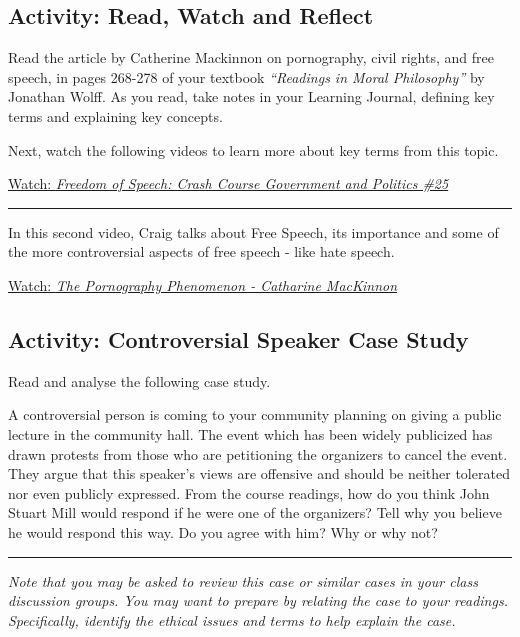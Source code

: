 \documentclass[
]{book}
\begin{document}
\hypertarget{activity-read-watch-and-reflect-7}{%
\subsection*{Activity: Read, Watch and Reflect}\label{activity-read-watch-and-reflect-7}}

\begin{reflect}
Read the article by Catherine Mackinnon on pornography, civil rights, and free speech, in pages 268-278 of your textbook \emph{``Readings in Moral Philosophy''} by Jonathan Wolff. As you read, take notes in your Learning Journal, defining key terms and explaining key concepts.

Next, watch the following videos to learn more about key terms from this topic.

\href{https://www.youtube.com/watch?v=Zeeq0qaEaLw}{Watch: \emph{Freedom of Speech: Crash Course Government and Politics \#25}}

\begin{center}\rule{0.5\linewidth}{0.5pt}\end{center}

In this second video, Craig talks about Free Speech, its importance and some of the more controversial aspects of free speech - like hate speech.

\href{https://www.youtube.com/watch?v=kdfPLJDmEIw}{Watch: \emph{The Pornography Phenomenon - Catharine MacKinnon}}
\end{reflect}

\hypertarget{activity-controversial-speaker-case-study}{%
\subsection*{Activity: Controversial Speaker Case Study}\label{activity-controversial-speaker-case-study}}

\begin{reflect}
Read and analyse the following case study.

A controversial person is coming to your community planning on giving a public lecture in the community hall. The event which has been widely publicized has drawn protests from those who are petitioning the organizers to cancel the event. They argue that this speaker's views are offensive and should be neither tolerated nor even publicly expressed. From the course readings, how do you think John Stuart Mill would respond if he were one of the organizers? Tell why you believe he would respond this way. Do you agree with him? Why or why not?

\begin{center}\rule{0.5\linewidth}{0.5pt}\end{center}

\emph{Note that you may be asked to review this case or similar cases in your class discussion groups. You may want to prepare by relating the case to your readings. Specifically, identify the ethical issues and terms to help explain the case.}
\end{reflect}
\end{document}
